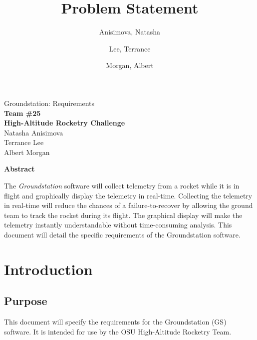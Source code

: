 \documentclass[10pt,journal,draftclsnofoot,onecolumn]{IEEEtran}
\begin{document}
	\singlespace
	
	\title{\vspace{2in}Problem Statement}
	
	\author {
		Anisimova, Natasha
		\and
		Lee, Terrance
		\and
		Morgan, Albert
	}
	
	
	\pagestyle{empty}
	\vspace*{2in}
	\begin{center}
		\huge
		Groundstation: Requirements\\
		\normalsize
		\vspace{5mm}
		\textbf{
			Team \#25\\
			High-Altitude Rocketry Challenge\\
		}
		\vspace{1mm}
		Natasha Anisimova\\
		Terrance Lee\\
		Albert Morgan
	\end{center}
	
	\vspace{5mm}
	
	\begin{center}
		\textbf{Abstract}
	\end{center}
	
	
	The \textit{Groundstation} software will collect telemetry from a rocket while it is in flight and graphically display the telemetry in real-time.
	Collecting the telemetry in real-time will reduce the chances of a failure-to-recover by allowing the ground team to track the rocket during its flight.
	The graphical display will make the telemetry instantly understandable without time-consuming analysis.
	This document will detail the specific requirements of the Groundstation software.

	
	
	\newpage
	
	\tableofcontents
	\newpage
	
	\pagestyle{headings}


	\section{Introduction}
	
	\subsection{Purpose}
	This document will specify the requirements for the Groundstation (GS) software.
	It is intended for use by the OSU High-Altitude Rocketry Team.
	
\end{document}
